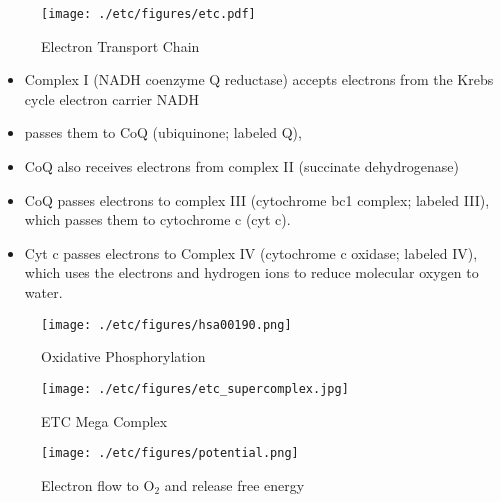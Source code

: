 \documentclass{scrartcl}
\begin{document}
\begin{enumerate}
\begin{figure}[htbp]
\centering
\texttt{[image: ./etc/figures/etc.pdf]}
\caption{\label{fig:orgd209180}
Electron Transport Chain}
\end{figure}

\begin{itemize}
\item Complex I (NADH coenzyme Q reductase) accepts electrons from the
Krebs cycle electron carrier NADH
\item passes them to CoQ (ubiquinone; labeled Q),
\item CoQ also receives electrons from complex II (succinate dehydrogenase)
\item CoQ passes electrons to complex III (cytochrome bc1 complex; labeled
III), which passes them to cytochrome c (cyt c).
\item Cyt c passes electrons to Complex IV (cytochrome c oxidase; labeled
IV), which uses the electrons and hydrogen ions to reduce molecular
oxygen to water.
\end{itemize}

\begin{figure}[htbp]
\centering
\texttt{[image: ./etc/figures/hsa00190.png]}
\caption[ETC]{\label{fig:orgfa5a986}
Oxidative Phosphorylation}
\end{figure}

\begin{figure}[htbp]
\centering
\texttt{[image: ./etc/figures/etc\_supercomplex.jpg]}
\caption[ETC mega complex]{\label{fig:org7d4bbba}
ETC Mega Complex}
\end{figure}

\begin{figure}[htbp]
\centering
\texttt{[image: ./etc/figures/potential.png]}
\caption[redox]{\label{fig:org0a9cb19}
Electron flow to O\(_{\text{2}}\) and release free energy}
\end{figure}
\end{enumerate}
\end{document}
